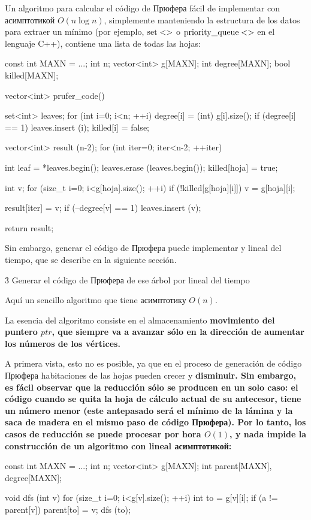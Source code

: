 Un algoritmo para calcular el código de Прюфера fácil de implementar con асимптотикой $O (n \log n)$, simplemente manteniendo la estructura de los datos para extraer un mínimo (por ejemplo, $\rm set<>$ o $\rm priority\_queue<>$ en el lenguaje C++), contiene una lista de todas las hojas:

\code
const int MAXN = ...;
int n;
vector<int> g[MAXN];
int degree[MAXN];
bool killed[MAXN];

vector<int> prufer_code() {
set<int> leaves;
for (int i=0; i<n; ++i) {
degree[i] = (int) g[i].size();
if (degree[i] == 1)
leaves.insert (i);
killed[i] = false;
}

vector<int> result (n-2);
for (int iter=0; iter<n-2; ++iter) {
int leaf = *leaves.begin();
leaves.erase (leaves.begin());
killed[hoja] = true;

int v;
for (size_t i=0; i<g[hoja].size(); ++i)
if (!killed[g[hoja][i]])
v = g[hoja][i];

result[iter] = v;
if (--degree[v] == 1)
leaves.insert (v);
}
return result;
}
\endcode

Sin embargo, generar el código de Прюфера puede implementar y lineal del tiempo, que se describe en la siguiente sección.


\h3{ Generar el código de Прюфера de ese árbol por lineal del tiempo }

Aquí un sencillo algoritmo que tiene асимптотику $O(n)$.

La esencia del algoritmo consiste en el almacenamiento \bf{movimiento del puntero} $ptr$, que siempre va a avanzar sólo en la dirección de aumentar los números de los vértices.

A primera vista, esto no es posible, ya que en el proceso de generación de código Прюфера habitaciones de las hojas pueden crecer y \bf{disminuir}. Sin embargo, es fácil observar que la reducción sólo se producen en un solo caso: el código cuando se quita la hoja de cálculo actual de su antecesor, tiene un número menor (este antepasado será el mínimo de la lámina y la saca de madera en el mismo paso de código Прюфера). Por lo tanto, los casos de reducción se puede procesar por hora $O(1)$, y nada impide la construcción de un algoritmo con \bf{lineal асимптотикой}:

\code
const int MAXN = ...;
int n;
vector<int> g[MAXN];
int parent[MAXN], degree[MAXN];

void dfs (int v) {
for (size_t i=0; i<g[v].size(); ++i) {
int to = g[v][i];
if (a != parent[v]) {
parent[to] = v;
dfs (to);
}
}
}

